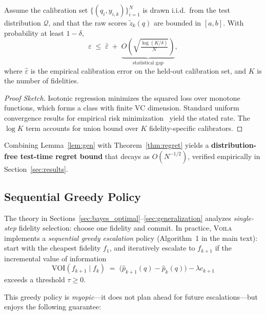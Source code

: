 \begin{lemma}
\label{lem:gen}
Assume the calibration set $\{(q_i, y_{i,k})\}_{i=1}^N$ is drawn i.i.d.\ from the test
distribution $\mathcal{Q}$, and that the raw scores $\tilde z_k(q)$ are bounded in $[a,b]$.
With probability at least $1-\delta$,
\[
\varepsilon
\;\le\;
\hat\varepsilon
\;+\;
\underbrace{O\!\left(\sqrt{\tfrac{\log(K/\delta)}{N}}\right)}_{\text{statistical gap}},
\]
where $\hat\varepsilon$ is the empirical calibration error on the held-out calibration set,
and $K$ is the number of fidelities.
\end{lemma}

\begin{proof}[Proof Sketch]
Isotonic regression minimizes the squared loss over monotone functions, which forms a
class with finite VC dimension. Standard uniform convergence results for empirical risk
minimization~\citep{vapnik1968uniform} yield the stated rate. The $\log K$ term accounts
for union bound over $K$ fidelity-specific calibrators.
\end{proof}

\noindent
Combining Lemma~\ref{lem:gen} with Theorem~\ref{thm:regret} yields a
\textbf{distribution-free test-time regret bound} that decays as $O(N^{-1/2})$,
verified empirically in Section~\ref{sec:results}.

\vspace{-0.3em}
\subsection{Sequential Greedy Policy}
\label{sec:greedy_policy}

The theory in Sections~\ref{sec:bayes_optimal}--\ref{sec:generalization} analyzes
\emph{single-step} fidelity selection: choose one fidelity and commit.
In practice, \textsc{Voila} implements a \emph{sequential greedy escalation} policy
(Algorithm~1 in the main text): start with the cheapest fidelity $f_1$, and iteratively
escalate to $f_{k+1}$ if the incremental value of information
\[
\text{VOI}(f_{k+1} \mid f_k)
\;=\;
\bigl(\hat p_{k+1}(q) - \hat p_k(q)\bigr) - \lambda c_{k+1}
\]
exceeds a threshold $\tau \ge 0$.

This greedy policy is \emph{myopic}---it does not plan ahead for future escalations---but
enjoys the following guarantee:

